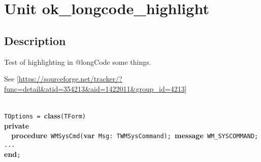 \documentclass{report}
\begin{document}
\label{toc}\tableofcontents
\newpage
\newlength{\tmplength}
\chapter{Unit ok{\_}longcode{\_}highlight}
\label{ok_longcode_highlight}
\section{Description}
Test of highlighting in @longCode some things.\hfill\vspace*{1ex}



See [\href{https://sourceforge.net/tracker/?func=detail&atid=354213&aid=1422011&group_id=4213}{https://sourceforge.net/tracker/?func=detail{\&}atid=354213{\&}aid=1422011{\&}group{\_}id=4213}]

\texttt{\\\nopagebreak[3]
TOptions~=~}\textbf{class}\texttt{(TForm)\\\nopagebreak[3]
}\textbf{private}\texttt{\\\nopagebreak[3]
~~}\textbf{procedure}\texttt{~WMSysCmd(}\textbf{var}\texttt{~Msg:~TWMSysCommand);~}\textbf{message}\texttt{~WM{\_}SYSCOMMAND;\\\nopagebreak[3]
...\\\nopagebreak[3]
}\textbf{end}\texttt{;\\
}
\end{document}
